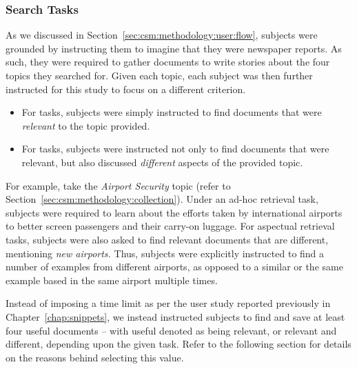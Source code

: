 \subsubsection{Search Tasks}
As we discussed in Section~\ref{sec:csm:methodology:user:flow}, subjects were grounded by instructing them to imagine that they were newspaper reports. As such, they were required to gather documents to write stories about the four topics they searched for. Given each topic, each subject was then further instructed for this study to focus on a different criterion.

\begin{itemize}
    \item{For  tasks, subjects were simply instructed to find documents that were \emph{relevant} to the topic provided.}
    \item{For  tasks, subjects were instructed not only to find documents that were relevant, but also discussed \emph{different} aspects of the provided topic.}
\end{itemize}

For example, take the \emph{Airport Security} topic (refer to Section~\ref{sec:csm:methodology:collection}). Under an ad-hoc retrieval task, subjects were required to learn about the efforts taken by international airports to better screen passengers and their carry-on luggage. For aspectual retrieval tasks, subjects were also asked to find relevant documents that are different, mentioning \emph{new airports.} Thus, subjects were explicitly instructed to find a number of examples from different airports, as opposed to a similar or the same example based in the same airport multiple times.

Instead of imposing a time limit as per the user study reported previously in Chapter~\ref{chap:snippets}, we instead instructed subjects to find and save at least four useful documents -- with useful denoted as being relevant, or relevant and different, depending upon the given task. Refer to the following section for details on the reasons behind selecting this value.

